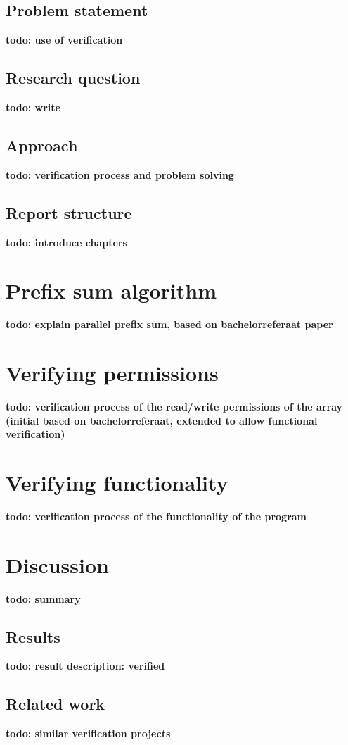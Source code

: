 \documentclass[a4paper]{article}
\newcommand{\todo}[1]{{\color{BurntOrange}\sffamily\textbf{todo: #1}\par}}
\begin{document}
\subsection{Problem statement}
\todo{use of verification}

\subsection{Research question}
\todo{write}

\subsection{Approach}
\todo{verification process and problem solving}

\subsection{Report structure}
\todo{introduce chapters}


\section{Prefix sum algorithm}
\todo{explain parallel prefix sum, based on bachelorreferaat paper}


\section{Verifying permissions}
\todo{verification process of the read/write permissions of the array (initial based on bachelorreferaat, extended to allow functional verification)}


\section{Verifying functionality}
\todo{verification process of the functionality of the program}


\section{Discussion}
\todo{summary}

\subsection{Results}
\todo{result description: verified}

\subsection{Related work}
\todo{similar verification projects}
\end{document}

